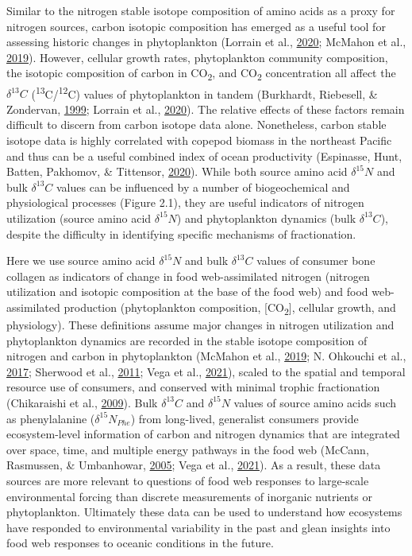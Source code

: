 \documentclass [11pt, proquest] {uwthesis}[2015/03/03]
\begin{document}
Similar to the nitrogen stable isotope composition of amino acids as a
proxy for nitrogen sources, carbon isotopic composition has emerged as a
useful tool for assessing historic changes in phytoplankton (Lorrain et
al., \protect\hyperlink{ref-Lorrain2020}{2020}; McMahon et al.,
\protect\hyperlink{ref-McMahon2019}{2019}). However, cellular growth
rates, phytoplankton community composition, the isotopic composition of
carbon in CO\textsubscript{2}, and CO\textsubscript{2} concentration all
affect the \(\delta^{13}C\)
(\textsuperscript{13}C/\textsuperscript{12}C) values of phytoplankton in
tandem (Burkhardt, Riebesell, \& Zondervan,
\protect\hyperlink{ref-Burkhardt1999}{1999}; Lorrain et al.,
\protect\hyperlink{ref-Lorrain2020}{2020}). The relative effects of
these factors remain difficult to discern from carbon isotope data
alone. Nonetheless, carbon stable isotope data is highly correlated with
copepod biomass in the northeast Pacific and thus can be a useful
combined index of ocean productivity (Espinasse, Hunt, Batten, Pakhomov,
\& Tittensor, \protect\hyperlink{ref-Espinasse2020}{2020}). While both
source amino acid \(\delta^{15}N\) and bulk \(\delta^{13}C\) values can
be influenced by a number of biogeochemical and physiological processes
(Figure 2.1), they are useful indicators of nitrogen utilization (source
amino acid \(\delta^{15}N\)) and phytoplankton dynamics (bulk
\(\delta^{13}C\)), despite the difficulty in identifying specific
mechanisms of fractionation.

Here we use source amino acid \(\delta^{15}N\) and bulk \(\delta^{13}C\)
values of consumer bone collagen as indicators of change in food
web-assimilated nitrogen (nitrogen utilization and isotopic composition
at the base of the food web) and food web-assimilated production
(phytoplankton composition, {[}CO\textsubscript{2}{]}, cellular growth,
and physiology). These definitions assume major changes in nitrogen
utilization and phytoplankton dynamics are recorded in the stable
isotope composition of nitrogen and carbon in phytoplankton (McMahon et
al., \protect\hyperlink{ref-McMahon2019}{2019}; N. Ohkouchi et al.,
\protect\hyperlink{ref-Ohkouchi2017}{2017}; Sherwood et al.,
\protect\hyperlink{ref-Sherwood2011}{2011}; Vega et al.,
\protect\hyperlink{ref-delaVega2021}{2021}), scaled to the spatial and
temporal resource use of consumers, and conserved with minimal trophic
fractionation (Chikaraishi et al.,
\protect\hyperlink{ref-Chikaraishi2009}{2009}). Bulk \(\delta^{13}C\)
and \(\delta^{15}N\) values of source amino acids such as phenylalanine
(\(\delta^{15}N_{Phe}\)) from long-lived, generalist consumers provide
ecosystem-level information of carbon and nitrogen dynamics that are
integrated over space, time, and multiple energy pathways in the food
web (McCann, Rasmussen, \& Umbanhowar,
\protect\hyperlink{ref-McCann2005}{2005}; Vega et al.,
\protect\hyperlink{ref-delaVega2021}{2021}). As a result, these data
sources are more relevant to questions of food web responses to
large-scale environmental forcing than discrete measurements of
inorganic nutrients or phytoplankton. Ultimately these data can be used
to understand how ecosystems have responded to environmental variability
in the past and glean insights into food web responses to oceanic
conditions in the future.
\end{document}
